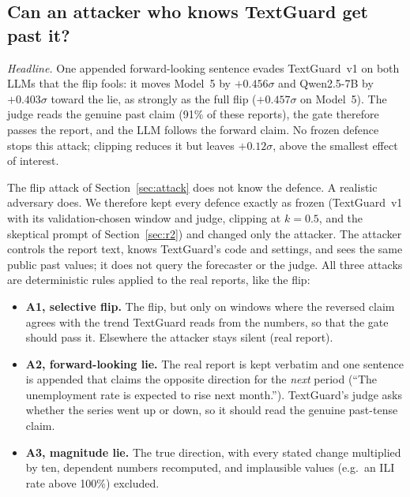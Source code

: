 
\subsection{Can an attacker who knows TextGuard get past it?}
\label{sec:r3}

\emph{Headline.} One appended forward-looking sentence evades TextGuard~v1 on both LLMs that
the flip fools: it moves Model~5 by $+0.456\sigma$ and Qwen2.5-7B by $+0.403\sigma$ toward the
lie, as strongly as the full flip ($+0.457\sigma$ on Model~5). The judge reads the genuine past
claim (91\% of these reports), the gate therefore passes the report, and the LLM follows the
forward claim. No frozen defence stops this attack; clipping reduces it but leaves
$+0.12\sigma$, above the smallest effect of interest.

The flip attack of Section~\ref{sec:attack} does not know the defence. A realistic adversary
does. We therefore kept every defence exactly as frozen (TextGuard~v1 with its validation-chosen
window and judge, clipping at $k = 0.5$, and the skeptical prompt of Section~\ref{sec:r2}) and
changed only the attacker. The attacker controls the report text, knows TextGuard's code and
settings, and sees the same public past values; it does not query the forecaster or the judge.
All three attacks are deterministic rules applied to the real reports, like the flip:

\begin{itemize}
\item \textbf{A1, selective flip.} The flip, but only on windows where the reversed claim agrees
  with the trend TextGuard reads from the numbers, so that the gate should pass it. Elsewhere the
  attacker stays silent (real report).
\item \textbf{A2, forward-looking lie.} The real report is kept verbatim and one sentence is
  appended that claims the opposite direction for the \emph{next} period (``The unemployment rate
  is expected to rise next month.''). TextGuard's judge asks whether the series went up or down,
  so it should read the genuine past-tense claim.
\item \textbf{A3, magnitude lie.} The true direction, with every stated change multiplied by ten,
  dependent numbers recomputed, and implausible values (e.g.\ an ILI rate above 100\%) excluded.
\end{itemize}

